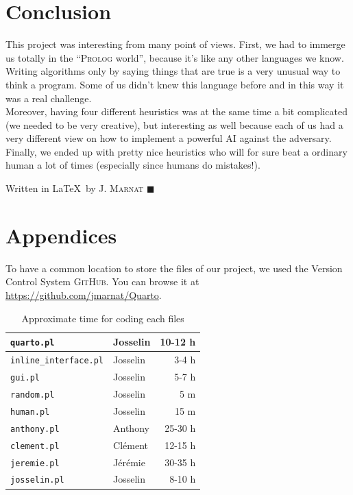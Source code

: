 \documentclass[a4paper,11pt]{article}
\newcommand{\tw}[1]{\texttt{#1}}
\newcommand{\mytable}[3]{
	\begin{table}[ht]
		\begin{center}
			\begin{tabular}{#2}
				#3
			\end{tabular}
		\caption{#1}
		\end{center}
	\end{table}
}
\begin{document}
	\section{Conclusion}
		This project was interesting from many point of views. First, we had to immerge us totally in the ``\textsc{Prolog} world'', because it's like any other languages we know. Writing algorithms only by saying things that are true is a very unusual way to think a program. Some of us didn't knew this language before and in this way it was a real challenge. \\
		Moreover, having four different heuristics was at the same time a bit complicated (we needed to be very creative), but interesting as well because each of us had a very different view on how to implement a powerful AI against the adversary. \\
		Finally, we ended up with pretty nice heuristics who will for sure beat a ordinary human a lot of times (especially since humans do mistakes!).

		\vfill
		\begin{flushright}
			\footnotesize{Written in \LaTeX\ by J. \textsc{Marnat} $\blacksquare$}
		\end{flushright}

	\newpage
	\section{Appendices}
		To have a common location to store the files of our project, we used the Version Control System \textsc{GitHub}. You can browse it at \href{https://github.com/jmarnat/Quarto}{https://github.com/jmarnat/Quarto}.\\[2cm]


		\mytable{Approximate time for coding each files}{|l||l|r|}{\hline
			\tw{quarto.pl}				& Josselin		& 10-12 h	\\\hline
			\tw{inline\_interface.pl}	& Josselin		& 3-4 h		\\\hline
			\tw{gui.pl}					& Josselin		& 5-7 h		\\\hline
			\tw{random.pl}				& Josselin		& 5 m		\\\hline
			\tw{human.pl}				& Josselin		& 15 m		\\\hline
			\tw{anthony.pl}				& Anthony		& 25-30 h	\\\hline
			\tw{clement.pl}				& Clément		& 12-15 h	\\\hline
			\tw{jeremie.pl}				& Jérémie		& 30-35 h	\\\hline
			\tw{josselin.pl}			& Josselin		& 8-10 h	\\\hline
		}
\end{document}
